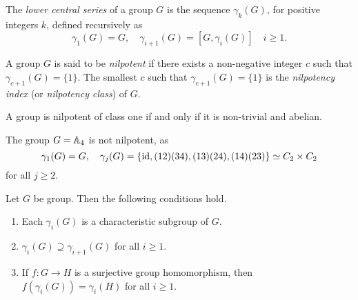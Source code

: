 The {\em lower central series} of a group $G$ is 
the sequence $\gamma_k(G)$, for positive integers $k$, 
defined recursively as 
\[
		\gamma_1(G)=G,\quad
		\gamma_{i+1}(G)=[G,\gamma_i(G)]\quad i\geq 1.
\]

A group $G$ is said to be {\em nilpotent} if there exists a non-negative integer $c$ such that 
$\gamma_{c+1}(G)=\{1\}$. The smallest $c$ such that $\gamma_{c+1}(G)=\{1\}$ is
the {\em nilpotency index} (or {\em nilpotency class}) of $G$. 


\begin{example}
	A group is nilpotent of class one if and only if it is  non-trivial and abelian.  
\end{example}


\begin{example}
    The group $G=\mathbb{A}_4$ is not nilpotent, as 
	\[
		\gamma_1(G)=G,\quad
		\gamma_j(G)=\{\operatorname{id},(12)(34),(13)(24),(14)(23)\}\simeq C_2\times C_2
	\]
	for all $j\geq2$. 
\end{example}

\begin{lemma}
	\label{xca:gamma}
	Let $G$ be group. Then the following conditions hold. %
	\begin{enumerate}
		\item Each $\gamma_i(G)$ is a characteristic subgroup of $G$.
		\item $\gamma_i(G)\supseteq\gamma_{i+1}(G)$ for all $i\geq1$.
		\item If $f\colon G\to H$ is a surjective group homomorphism, then 
			$f(\gamma_i(G))=\gamma_i(H)$ for all $i\geq 1$.
	\end{enumerate}
\end{lemma}

